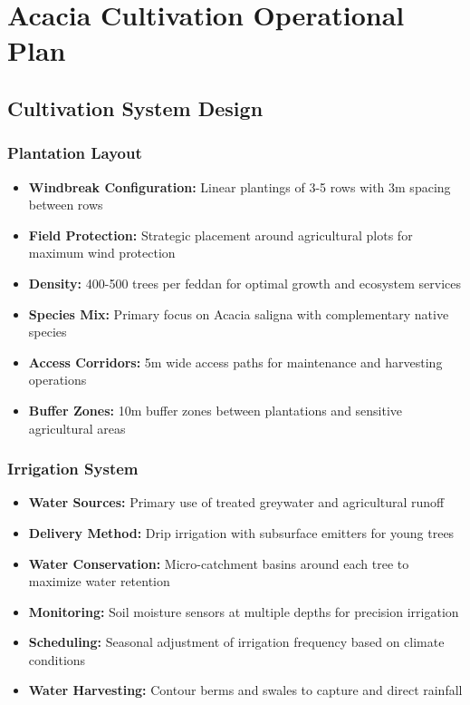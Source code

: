 \section{Acacia Cultivation Operational Plan}

\subsection{Cultivation System Design}

\subsubsection{Plantation Layout}
\begin{itemize}
    \item \textbf{Windbreak Configuration:} Linear plantings of 3-5 rows with 3m spacing between rows
    \item \textbf{Field Protection:} Strategic placement around agricultural plots for maximum wind protection
    \item \textbf{Density:} 400-500 trees per feddan for optimal growth and ecosystem services
    \item \textbf{Species Mix:} Primary focus on Acacia saligna with complementary native species
    \item \textbf{Access Corridors:} 5m wide access paths for maintenance and harvesting operations
    \item \textbf{Buffer Zones:} 10m buffer zones between plantations and sensitive agricultural areas
\end{itemize}

\subsubsection{Irrigation System}
\begin{itemize}
    \item \textbf{Water Sources:} Primary use of treated greywater and agricultural runoff
    \item \textbf{Delivery Method:} Drip irrigation with subsurface emitters for young trees
    \item \textbf{Water Conservation:} Micro-catchment basins around each tree to maximize water retention
    \item \textbf{Monitoring:} Soil moisture sensors at multiple depths for precision irrigation
    \item \textbf{Scheduling:} Seasonal adjustment of irrigation frequency based on climate conditions
    \item \textbf{Water Harvesting:} Contour berms and swales to capture and direct rainfall
\end{itemize}

